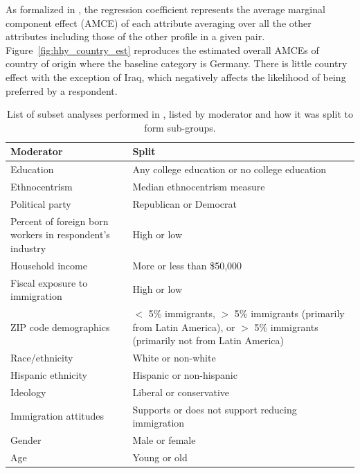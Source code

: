 \documentclass[11pt]{article}
\newcommand\spacingset[1]{\renewcommand{\baselinestretch}%
  {#1}\small\normalsize}
\begin{document}
As formalized in \cite{hainmueller2014causal}, the regression
coefficient represents the average marginal component effect (AMCE) of
each attribute averaging over all the other attributes including those
of the other profile in a given pair. 
Figure~\ref{fig:hhy_country_est} reproduces the estimated overall
AMCEs of country of origin where the baseline category is Germany.
There is little country effect with the exception of Iraq, which
negatively affects the likelihood of being preferred by a respondent.

\begin{table}[t!]
    \centering\small
    \begin{tabular}{|p{0.35\linewidth}|p{0.65\linewidth}|}
    \hline
    Moderator &Split\\
     \hline
     Education & Any college education or no college education\\
     Ethnocentrism & Median ethnocentrism measure\\
     Political party & Republican or Democrat\\
     Percent of foreign born workers in respondent's industry & High or low \\
     Household income & More or less than \$50,000\\
     Fiscal exposure to immigration & High or low\\
     ZIP code demographics & $<$ 5\% immigrants, $>$ 5\% immigrants (primarily from Latin America), or $>$ 5\% immigrants (primarily not from Latin America) \\
     Race/ethnicity & White or non-white\\
     Hispanic ethnicity & Hispanic or non-hispanic \\
     Ideology & Liberal or conservative\\
     Immigration attitudes & Supports or does not support reducing immigration\\
     Gender & Male or female \\
     Age & Young or old \\
     \hline
    \end{tabular}
    \spacingset{1}
     \caption{List of subset analyses performed in \cite{hainmueller2015hidden}, listed by moderator and how it was split to form sub-groups.}\label{tab:subsets}
\end{table}
\end{document}
